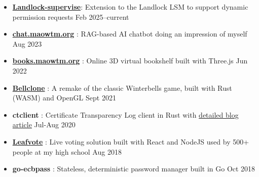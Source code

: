   \begin{itemize}
    \item \href{https://lore.kernel.org/all/cover.1741047969.git.m%40maowtm.org}{\textbf{\color{link}Landlock-supervise}}: Extension to the Landlock LSM to support dynamic permission requests \dashdiv{} Feb 2025--current

    \item \href{https://chat.maowtm.org}{\textbf{\color{link}chat.maowtm.org}} : RAG-based AI chatbot doing an impression of myself \dashdiv{} Aug 2023

    \item \href{https://books.maowtm.org}{\textbf{\color{link}books.maowtm.org}} : Online 3D virtual bookshelf built with Three.js \dashdiv{} Jun 2022

    \item \href{https://bellclone.maowtm.org/}{\color{link}\textbf{Bellclone}} : A remake of the classic Winterbells game, built with Rust (WASM) and OpenGL \dashdiv{} Sept 2021

    \item \textbf{ctclient} : Certificate Transparency Log client in Rust with \href{https://blog.maowtm.org/ct/en.html}{\color{link}detailed blog article} \dashdiv{} Jul-Aug 2020

    \item \href{https://leafvote.mww.moe}{\color{link}\textbf{Leafvote}} : Live voting solution built with React and NodeJS used by 500+ people at my high school \dashdiv{} Aug 2018

    \item \textbf{go-ecbpass} : Stateless, deterministic password manager built in Go \dashdiv{} Oct 2018

  \end{itemize}


